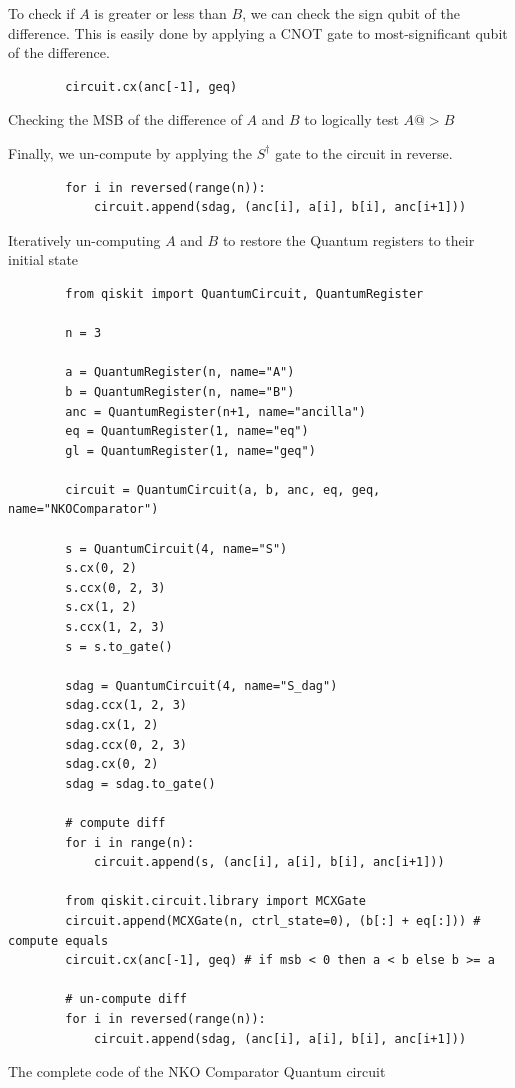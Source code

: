 To check if $A$ is greater or less than $B$, we can check the sign qubit of the difference. This is easily
done by applying a CNOT gate to most-significant qubit of the difference.

\begin{listing}[!ht]
    \centering
    \begin{verbatim}
        circuit.cx(anc[-1], geq)
    \end{verbatim}
    \caption{Checking the MSB of the difference of $A$ and $B$ to logically test $A @> B$}
\end{listing}

\newpage

Finally, we un-compute by applying the $S^\dag$ gate to the circuit in reverse.

\begin{listing}[ht]
    \centering
    \begin{verbatim}
        for i in reversed(range(n)):
            circuit.append(sdag, (anc[i], a[i], b[i], anc[i+1]))
    \end{verbatim}
    \caption{Iteratively un-computing $A$ and $B$ to restore the Quantum registers to their initial state}
\end{listing}

\begin{listing}[ht]
    \centering
    \begin{verbatim}
        from qiskit import QuantumCircuit, QuantumRegister

        n = 3

        a = QuantumRegister(n, name="A")
        b = QuantumRegister(n, name="B")
        anc = QuantumRegister(n+1, name="ancilla")
        eq = QuantumRegister(1, name="eq")
        gl = QuantumRegister(1, name="geq")

        circuit = QuantumCircuit(a, b, anc, eq, geq, name="NKOComparator")

        s = QuantumCircuit(4, name="S")
        s.cx(0, 2)
        s.ccx(0, 2, 3)
        s.cx(1, 2)
        s.ccx(1, 2, 3)
        s = s.to_gate()
            
        sdag = QuantumCircuit(4, name="S_dag")
        sdag.ccx(1, 2, 3)
        sdag.cx(1, 2)
        sdag.ccx(0, 2, 3)
        sdag.cx(0, 2)
        sdag = sdag.to_gate()

        # compute diff
        for i in range(n):
            circuit.append(s, (anc[i], a[i], b[i], anc[i+1]))

        from qiskit.circuit.library import MCXGate
        circuit.append(MCXGate(n, ctrl_state=0), (b[:] + eq[:])) # compute equals
        circuit.cx(anc[-1], geq) # if msb < 0 then a < b else b >= a

        # un-compute diff
        for i in reversed(range(n)):
            circuit.append(sdag, (anc[i], a[i], b[i], anc[i+1]))
    \end{verbatim}
    \caption{The complete code of the NKO Comparator Quantum circuit}
\end{listing}